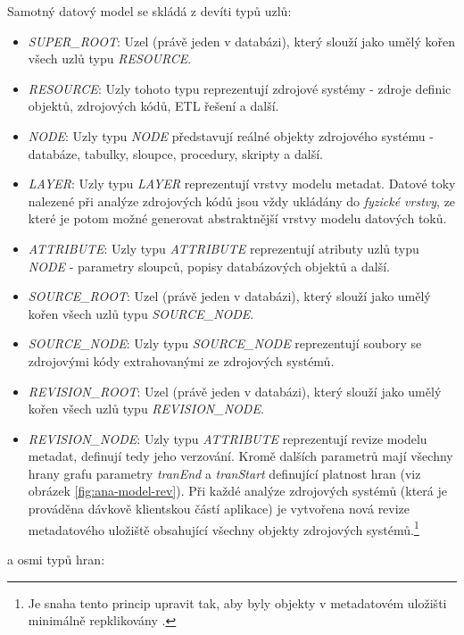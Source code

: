 Samotný datový model se skládá z devíti typů uzlů:

\begin{itemize}
	\item{\textit{SUPER\_ROOT}}: Uzel (právě jeden v databázi), který slouží jako umělý kořen všech uzlů typu \textit{RESOURCE}. 
	\item{\textit{RESOURCE}}: Uzly tohoto typu reprezentují zdrojové systémy - zdroje definic objektů, zdrojových kódů, ETL řešení a další.  
	\item{\textit{NODE}}: Uzly typu \textit{NODE} představují reálné objekty zdrojového systému - databáze, tabulky, sloupce, procedury, skripty a další. 
	\item{\textit{LAYER}}: Uzly typu \textit{LAYER} reprezentují vrstvy modelu metadat. Datové toky nalezené při analýze zdrojových kódů jsou vždy ukládány do \textit{fyzické vrstvy}, ze které je potom možné generovat abstraktnější vrstvy modelu datových toků.  
	\item{\textit{ATTRIBUTE}}: Uzly typu \textit{ATTRIBUTE} reprezentují atributy uzlů typu \textit{NODE} - parametry sloupců, popisy databázových objektů a další.
	\item{\textit{SOURCE\_ROOT}}: Uzel (právě jeden v databázi), který slouží jako umělý kořen všech uzlů typu \textit{SOURCE\_NODE}. 
	\item{\textit{SOURCE\_NODE}}: Uzly typu \textit{SOURCE\_NODE} reprezentují soubory se zdrojovými kódy extrahovanými ze zdrojových systémů. 
	\item{\textit{REVISION\_ROOT}}: Uzel (právě jeden v databázi), který slouží jako umělý kořen všech uzlů typu \textit{REVISION\_NODE}. 
	\item{\textit{REVISION\_NODE}}: Uzly typu \textit{ATTRIBUTE} reprezentují revize modelu metadat, definují tedy jeho verzování. Kromě dalších parametrů mají všechny hrany grafu parametry \textit{tranEnd} a \textit{tranStart} definující platnost hran (viz obrázek \ref{fig:ana-model-rev}). Při každé analýze zdrojových systémů (která je prováděna dávkově klientskou částí aplikace) je vytvořena nová revize metadatového uložiště obsahující všechny objekty zdrojových systémů.\footnote{Je snaha tento princip upravit tak, aby byly objekty v metadatovém uložišti minimálně repklikovány \cite{Sykora17}.}  
\end{itemize}

 a osmi typů hran:

